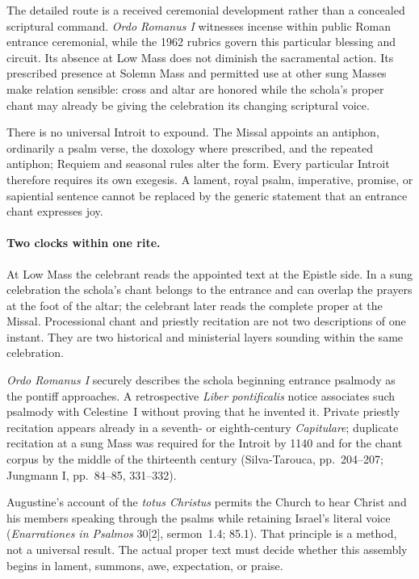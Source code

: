 The detailed route is a received ceremonial development rather than a concealed scriptural command. \emph{Ordo Romanus I} witnesses incense within public Roman entrance ceremonial, while the 1962 rubrics govern this particular blessing and circuit. Its absence at Low Mass does not diminish the sacramental action. Its prescribed presence at Solemn Mass and permitted use at other sung Masses make relation sensible: cross and altar are honored while the schola's proper chant may already be giving the celebration its changing scriptural voice.


There is no universal Introit to expound. The Missal appoints an antiphon, ordinarily a psalm verse, the doxology where prescribed, and the repeated antiphon; Requiem and seasonal rules alter the form. Every particular Introit therefore requires its own exegesis. A lament, royal psalm, imperative, promise, or sapiential sentence cannot be replaced by the generic statement that an entrance chant expresses joy.

\paragraph{Two clocks within one rite.}
At Low Mass the celebrant reads the appointed text at the Epistle side. In a sung celebration the schola's chant belongs to the entrance and can overlap the prayers at the foot of the altar; the celebrant later reads the complete proper at the Missal. Processional chant and priestly recitation are not two descriptions of one instant. They are two historical and ministerial layers sounding within the same celebration.

\emph{Ordo Romanus I} securely describes the schola beginning entrance psalmody as the pontiff approaches. A retrospective \emph{Liber pontificalis} notice associates such psalmody with Celestine~I without proving that he invented it. Private priestly recitation appears already in a seventh- or eighth-century \emph{Capitulare}; duplicate recitation at a sung Mass was required for the Introit by 1140 and for the chant corpus by the middle of the thirteenth century (Silva-Tarouca, pp.~204--207; Jungmann I, pp.~84--85, 331--332).

Augustine's account of the \emph{totus Christus} permits the Church to hear Christ and his members speaking through the psalms while retaining Israel's literal voice (\emph{Enarrationes in Psalmos} 30[2], sermon~1.4; 85.1). That principle is a method, not a universal result. The actual proper text must decide whether this assembly begins in lament, summons, awe, expectation, or praise.

